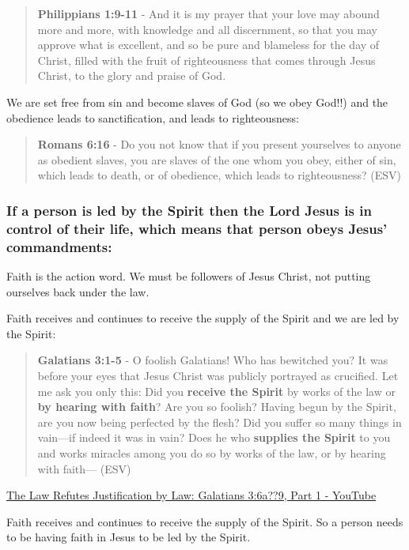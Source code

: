 \documentclass[11pt]{article}
\begin{document}
\begin{quote}
\textbf{Philippians 1:9-11} - And it is my prayer that your love may abound more and more, with knowledge and all discernment, so that you may approve what is excellent, and so be pure and blameless for the day of Christ, filled with the fruit of righteousness that comes through Jesus Christ, to the glory and praise of God.
\end{quote}

We are set free from sin and become slaves of God (so we obey God!!) and the obedience leads to sanctification, and leads to righteousness:

\begin{quote}
\textbf{Romans 6:16} - Do you not know that if you present yourselves to anyone as obedient slaves, you are slaves of the one whom you obey, either of sin, which leads to death, or of obedience, which leads to righteousness? (ESV)
\end{quote}

\subsubsection{If a person is led by the Spirit then the Lord Jesus is in control of their life, which means that person obeys Jesus' commandments:}
\label{sec:org20dbf76}

Faith is the action word. We must be followers of Jesus Christ, not putting ourselves back under the law.

Faith receives and continues to receive the supply of the Spirit and we are led by the Spirit:

\begin{quote}
\textbf{Galatians 3:1-5} - O foolish Galatians! Who has bewitched you? It was before your eyes that Jesus Christ was publicly portrayed as crucified. Let me ask you only this: Did you \textbf{receive the Spirit} by works of the law or \textbf{by hearing with faith}? Are you so foolish? Having begun by the Spirit, are you now being perfected by the flesh? Did you suffer so many things in vain—if indeed it was in vain? Does he who \textbf{supplies the Spirit} to you and works miracles among you do so by works of the law, or by hearing with faith— (ESV)
\end{quote}

\href{https://www.youtube.com/watch?v=34pBf5pZq\_I}{The Law Refutes Justification by Law: Galatians 3:6a??9, Part 1 - YouTube}

Faith receives and continues to receive the supply of the Spirit. So a person needs to be having faith in Jesus to be led by the Spirit.
\end{document}
